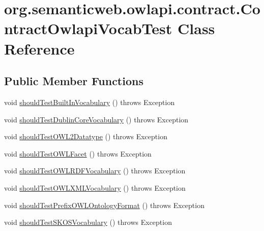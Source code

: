 \hypertarget{classorg_1_1semanticweb_1_1owlapi_1_1contract_1_1_contract_owlapi_vocab_test}{\section{org.\-semanticweb.\-owlapi.\-contract.\-Contract\-Owlapi\-Vocab\-Test Class Reference}
\label{classorg_1_1semanticweb_1_1owlapi_1_1contract_1_1_contract_owlapi_vocab_test}
}
\subsection*{Public Member Functions}
\begin{DoxyCompactItemize}
\item 
void \hyperlink{classorg_1_1semanticweb_1_1owlapi_1_1contract_1_1_contract_owlapi_vocab_test_a0537998ea286faac92b212534f831f2f}{should\-Test\-Built\-In\-Vocabulary} ()  throws Exception 
\item 
void \hyperlink{classorg_1_1semanticweb_1_1owlapi_1_1contract_1_1_contract_owlapi_vocab_test_ad989fddf6921d1ccde036fd5420ab2f4}{should\-Test\-Dublin\-Core\-Vocabulary} ()  throws Exception 
\item 
void \hyperlink{classorg_1_1semanticweb_1_1owlapi_1_1contract_1_1_contract_owlapi_vocab_test_a868da756c931498612b81a27fe8f0717}{should\-Test\-O\-W\-L2\-Datatype} ()  throws Exception 
\item 
void \hyperlink{classorg_1_1semanticweb_1_1owlapi_1_1contract_1_1_contract_owlapi_vocab_test_a3061708ac75faf94e44fcffb20cd117d}{should\-Test\-O\-W\-L\-Facet} ()  throws Exception 
\item 
void \hyperlink{classorg_1_1semanticweb_1_1owlapi_1_1contract_1_1_contract_owlapi_vocab_test_a7c30773310f4f34f4986735bf8582d99}{should\-Test\-O\-W\-L\-R\-D\-F\-Vocabulary} ()  throws Exception 
\item 
void \hyperlink{classorg_1_1semanticweb_1_1owlapi_1_1contract_1_1_contract_owlapi_vocab_test_a43a8c7098e2ff651ff0436b63393c6a2}{should\-Test\-O\-W\-L\-X\-M\-L\-Vocabulary} ()  throws Exception 
\item 
void \hyperlink{classorg_1_1semanticweb_1_1owlapi_1_1contract_1_1_contract_owlapi_vocab_test_a178bbaa36e53c6dde00f44020aae1ce6}{should\-Test\-Prefix\-O\-W\-L\-Ontology\-Format} ()  throws Exception 
\item 
void \hyperlink{classorg_1_1semanticweb_1_1owlapi_1_1contract_1_1_contract_owlapi_vocab_test_ae0fde68d5ec951080ba2545ff8a18f50}{should\-Test\-S\-K\-O\-S\-Vocabulary} ()  throws Exception 

\end{DoxyCompactItemize}
